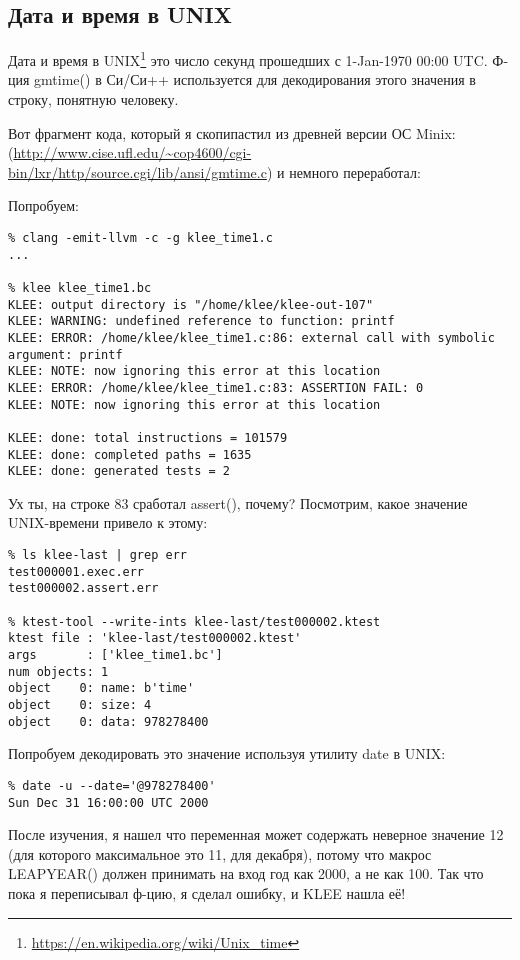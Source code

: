\subsection{Дата и время в UNIX}

Дата и время в UNIX\footnote{\url{https://en.wikipedia.org/wiki/Unix_time}} это число секунд прошедших с
1-Jan-1970 00:00 UTC.
Ф-ция gmtime() в Си/Си++ используется для декодирования этого значения в строку, понятную человеку.

Вот фрагмент кода, который я скопипастил из древней версии ОС Minix:
(\url{http://www.cise.ufl.edu/~cop4600/cgi-bin/lxr/http/source.cgi/lib/ansi/gmtime.c}) и немного переработал:



Попробуем:

\begin{lstlisting}
% clang -emit-llvm -c -g klee_time1.c
...

% klee klee_time1.bc
KLEE: output directory is "/home/klee/klee-out-107"
KLEE: WARNING: undefined reference to function: printf
KLEE: ERROR: /home/klee/klee_time1.c:86: external call with symbolic argument: printf
KLEE: NOTE: now ignoring this error at this location
KLEE: ERROR: /home/klee/klee_time1.c:83: ASSERTION FAIL: 0
KLEE: NOTE: now ignoring this error at this location

KLEE: done: total instructions = 101579
KLEE: done: completed paths = 1635
KLEE: done: generated tests = 2
\end{lstlisting}

Ух ты, на строке 83 сработал assert(), почему?
Посмотрим, какое значение UNIX-времени привело к этому:

\begin{lstlisting}
% ls klee-last | grep err
test000001.exec.err
test000002.assert.err

% ktest-tool --write-ints klee-last/test000002.ktest
ktest file : 'klee-last/test000002.ktest'
args       : ['klee_time1.bc']
num objects: 1
object    0: name: b'time'
object    0: size: 4
object    0: data: 978278400
\end{lstlisting}

Попробуем декодировать это значение используя утилиту date в UNIX:

\begin{lstlisting}
% date -u --date='@978278400'
Sun Dec 31 16:00:00 UTC 2000
\end{lstlisting}

После изучения, я нашел что переменная  может содержать неверное значение 12 (для которого максимальное это 11,
для декабря), 
потому что макрос LEAPYEAR() должен принимать на вход год как 2000, а не как 100.
Так что пока я переписывал ф-цию, я сделал ошибку, и KLEE нашла её!

